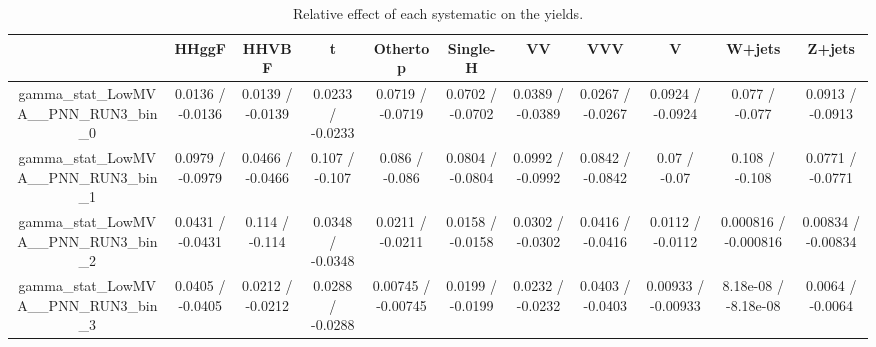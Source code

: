 \documentclass[10pt]{article}
\begin{document}
\begin{table}[htbp]
\begin{center}
\begin{tabular}{|c|c|c|c|c|c|c|c|c|c|c|}
\hline 
      & HHggF      & HHVBF      & t      & Othertop      & Single-H      & VV      & VVV      & V      & W+jets      & Z+jets \\ 
\hline 
  gamma_stat_LowMVA__PNN_RUN3_bin_0 & 0.0136 / -0.0136 & 0.0139 / -0.0139 & 0.0233 / -0.0233 & 0.0719 / -0.0719 & 0.0702 / -0.0702 & 0.0389 / -0.0389 & 0.0267 / -0.0267 & 0.0924 / -0.0924 & 0.077 / -0.077 & 0.0913 / -0.0913 \\ 
  gamma_stat_LowMVA__PNN_RUN3_bin_1 & 0.0979 / -0.0979 & 0.0466 / -0.0466 & 0.107 / -0.107 & 0.086 / -0.086 & 0.0804 / -0.0804 & 0.0992 / -0.0992 & 0.0842 / -0.0842 & 0.07 / -0.07 & 0.108 / -0.108 & 0.0771 / -0.0771 \\ 
  gamma_stat_LowMVA__PNN_RUN3_bin_2 & 0.0431 / -0.0431 & 0.114 / -0.114 & 0.0348 / -0.0348 & 0.0211 / -0.0211 & 0.0158 / -0.0158 & 0.0302 / -0.0302 & 0.0416 / -0.0416 & 0.0112 / -0.0112 & 0.000816 / -0.000816 & 0.00834 / -0.00834 \\ 
  gamma_stat_LowMVA__PNN_RUN3_bin_3 & 0.0405 / -0.0405 & 0.0212 / -0.0212 & 0.0288 / -0.0288 & 0.00745 / -0.00745 & 0.0199 / -0.0199 & 0.0232 / -0.0232 & 0.0403 / -0.0403 & 0.00933 / -0.00933 & 8.18e-08 / -8.18e-08 & 0.0064 / -0.0064 \\ 
\hline 
\end{tabular} 
\caption{Relative effect of each systematic on the yields.} 
\end{center} 
\end{table} 
\end{document}
